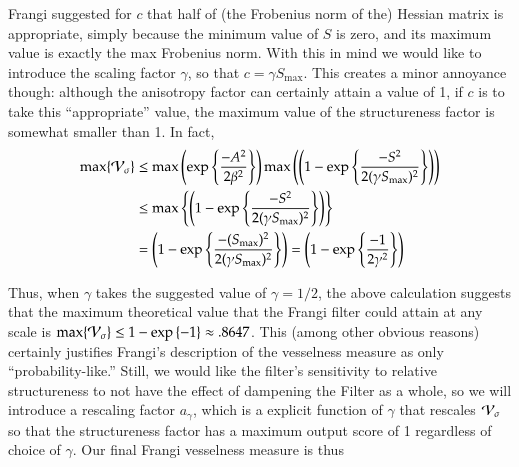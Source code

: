 Frangi suggested for $c$ that half of (the Frobenius norm of the) Hessian matrix is appropriate, simply because the minimum value of $S$ is zero, and its maximum value is exactly the max Frobenius norm. With this in mind we would like to introduce the scaling factor
$\gamma$, so that $ c = \gamma S_{\max}$. This creates a minor annoyance though: although the anisotropy factor can certainly attain a value of 1, if $c$ is to take this ``appropriate'' value, the maximum value of the structureness factor is somewhat smaller than 1. In fact,
\begin{equation}
\begin{aligned}
\max\{\mathcal{V}_{\sigma}\} &\le \max\left(
\exp\left\{\frac{-A^2}{2\beta^2}\right\}
\right)
\max\left(
\left(1 - \exp\left\{\frac{-S^2}{2(\gamma S_{\max})^2}\right\}\right)
\right) \\
&\le \max\left\{
\left(1 - \exp\left\{\frac{-S^2}{2(\gamma S_{\max})^2}\right\}\right)
\right\} \\
&= 
\left(1 - \exp\left\{\frac{-(S_{\max})^2}{2(\gamma S_{\max})^2}\right\}
\right)
= \left(1 - \exp\left\{\frac{-1}{2\gamma^2}\right\}
\right)
\end{aligned}
\end{equation}

Thus, when $\gamma$ takes the suggested value of $\gamma = 1/2$, the above calculation suggests that
the maximum theoretical value that the Frangi filter could attain at any scale is
$ \max \{ \mathcal{V}_{\sigma} \} \le 1 - \exp\left\{ -1 \right\} \approx .8647$.
This (among other obvious reasons) certainly justifies Frangi's description of the vesselness measure as only ``probability-like.'' Still, we would like the filter's sensitivity to relative structureness to not have the effect of dampening the Filter as a whole, so we will introduce a rescaling factor $a_\gamma$, which is a explicit function of $\gamma$ that rescales $\mathcal{V}_{\sigma}$ so that the structureness factor has a maximum output score of 1 regardless of choice of $\gamma$. Our final Frangi vesselness measure is thus

